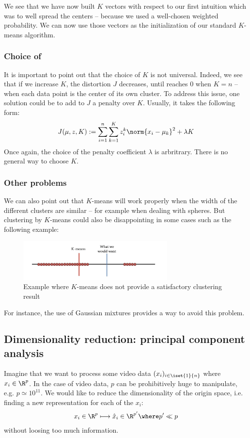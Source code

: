 \documentclass[toc, titlepaged]{../cs-classes/cs-classes}
\begin{document}
We see that we have now built $K$ vectors with respect to our first intuition which was to well spread the centers -- because we used a well-chosen weighted probability. We can now use those vectors as the initialization of our standard $K$-means algorithm.

\subsubsection{Choice of }
It is important to point out that the choice of $K$ is not universal. Indeed, we see that if we increase $K$, the distortion $J$ decreases, until reaches $0$ when $K=n$ --  when each data point is the center of its own cluster. To address this issue, one solution could be to add to $J$ a penalty over $K$. Usually, it takes the following form:
\begin{equation*}
    J(\mu, z, K) := \sum_{i=1}^n\sum_{k=1}^K z_i^k\norm{x_i-\mu_k}^2+\lambda K
\end{equation*}
Once again, the choice of the penalty coefficient $\lambda$ is arbritrary. There is no general way to choose $K$.

\subsubsection{Other problems}
We can also point out that $K$-means will work properly when the width of the different clusters are similar -- for example when dealing with spheres. But clustering by $K$-means could also be disappointing in some cases such as the following example:
\begin{figure}[H]
    \centering
    \includegraphics[width=0.7\textwidth]{images/k-means-limitations.png}
    \caption{Example where $K$-means does not provide a satisfactory clustering result}
\end{figure}
For instance, the use of Gaussian mixtures provides a way to avoid this problem.

\subsection{Dimensionality reduction: principal component analysis}
Imagine that we want to process some video data $(x_i)_{i\in\iset{1}{n}}$ where $x_i\in\R^p$. In the case of video data, $p$ can be prohibitively huge to manipulate, e.g. $p\simeq10^{11}$. We would like to reduce the dimensionality of the origin space, i.e. finding a new representation for each of the $x_i$:
\begin{equation*}
    x_i\in\R^p \longmapsto \hat{x}_i\in\R^{p'} \where p' \ll p
\end{equation*}
without loosing too much information.
\end{document}
